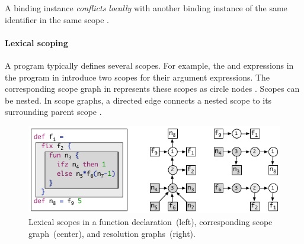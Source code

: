 \begin{definition}
A binding instance  
  \emph{conflicts locally}
  with another binding instance  
  of the same identifier 
  in the same scope .
\end{definition}

\paragraph{Lexical scoping}

A program typically defines several scopes.
For example, 
  the  and  expressions in the program in  
  introduce two scopes for their argument expressions.
The corresponding scope graph in 
  represents these scopes as circle nodes 
    .
Scopes can be nested.
In scope graphs, a directed edge  
  connects a nested scope  
  to its surrounding parent scope .

\begin{figure}[htb]
\begin{center}
  \includegraphics[trim=0.175cm 0cm 0cm 0cm]{figures/scope-graphs/lexical/example}
  \caption{%
    Lexical scopes in a function declaration~(left), 
    corresponding scope graph~(center), and resolution graphs~(right).}
\end{center}
\end{figure}

